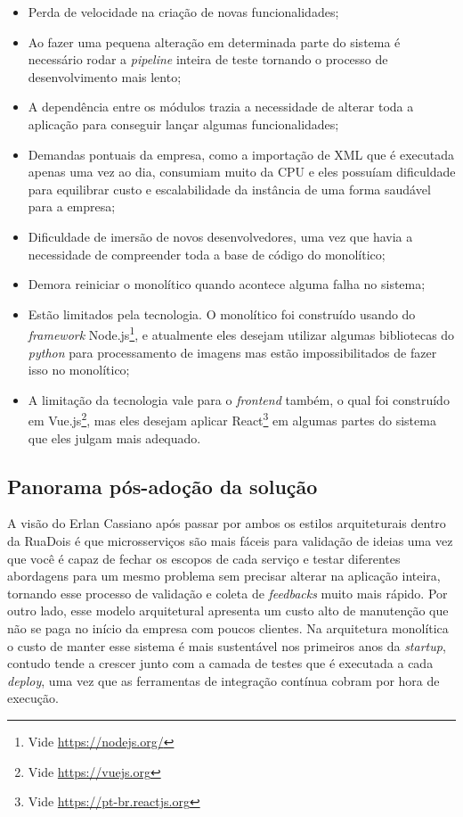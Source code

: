\begin{itemize}
    \item Perda de velocidade na criação de novas funcionalidades;
    \item Ao fazer uma pequena alteração em determinada parte do sistema é necessário rodar a
        \textit{pipeline} inteira de teste tornando o processo de desenvolvimento mais lento;
    \item A dependência entre os módulos trazia a necessidade de alterar toda a aplicação para
        conseguir lançar algumas funcionalidades;
    \item Demandas pontuais da empresa, como a importação de XML que é executada apenas uma vez ao
        dia, consumiam muito da CPU e eles possuíam dificuldade para equilibrar custo e
        escalabilidade da instância de uma forma saudável para a empresa;
    \item Dificuldade de imersão de novos desenvolvedores, uma vez que havia a necessidade de
        compreender toda a base de código do monolítico;
    \item Demora reiniciar o monolítico quando acontece alguma falha no sistema;
    \item Estão limitados pela tecnologia. O monolítico foi construído usando do \textit{framework}
        Node.js\footnote{Vide \url{https://nodejs.org/}}, e atualmente eles desejam utilizar algumas
        bibliotecas do \textit{python} para processamento de imagens mas estão impossibilitados de
        fazer isso no monolítico;
    \item A limitação da tecnologia vale para o \textit{frontend} também, o qual foi construído em
        Vue.js\footnote{Vide \url{https://vuejs.org}}, mas eles desejam aplicar React\footnote{Vide
        \url{https://pt-br.reactjs.org}} em algumas partes do sistema que eles julgam mais adequado.
\end{itemize}

\subsection{Panorama pós-adoção da solução}

A visão do Erlan Cassiano após passar por ambos os estilos arquiteturais dentro da RuaDois é que
microsserviços são mais fáceis para validação de ideias uma vez que você é capaz de fechar os
escopos de cada serviço e testar diferentes abordagens para um mesmo problema sem precisar alterar na
aplicação inteira, tornando esse processo de validação e coleta de \textit{feedbacks} muito mais
rápido. Por outro lado, esse modelo arquitetural apresenta um custo alto de manutenção que não se
paga no início da empresa com poucos clientes. Na arquitetura monolítica o custo de manter esse
sistema é mais sustentável nos primeiros anos da \textit{startup}, contudo tende a crescer junto com
a camada de testes que é executada a cada \textit{deploy}, uma vez que as ferramentas de integração
contínua cobram por hora de execução.

